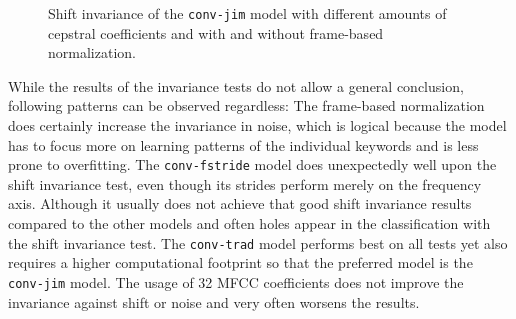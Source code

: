 \begin{figure}[!ht]
  \centering
  \caption{Shift invariance of the \texttt{conv-jim} model with different amounts of cepstral coefficients and with and without frame-based normalization.}
  \label{fig:exp_fs_cepstral_tb_shift_conv-jim}
\end{figure}
\FloatBarrier
\noindent
While the results of the invariance tests do not allow a general conclusion, following patterns can be observed regardless:
The frame-based normalization does certainly increase the invariance in noise, which is logical because the model has to focus more on learning patterns of the individual keywords and is less prone to overfitting.
The \texttt{conv-fstride} model does unexpectedly well upon the shift invariance test, even though its strides perform merely on the frequency axis.
Although it usually does not achieve that good shift invariance results compared to the other models and often holes appear in the classification with the shift invariance test.
The \texttt{conv-trad} model performs best on all tests yet also requires a higher computational footprint so that the preferred model is the \texttt{conv-jim} model.
The usage of 32 MFCC coefficients does not improve the invariance against shift or noise and very often worsens the results.




